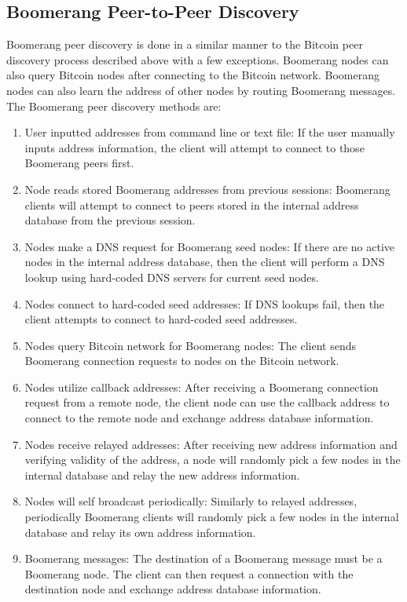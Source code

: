 \subsection{Boomerang Peer-to-Peer Discovery}
Boomerang peer discovery is done in a similar manner to the Bitcoin peer discovery process described above with a few exceptions. Boomerang nodes can also query Bitcoin nodes after connecting to the Bitcoin network. Boomerang nodes can also learn the address of other nodes by routing Boomerang messages. The Boomerang peer discovery methods are:

\begin{enumerate}
	\item User inputted addresses from command line or text file: If the user manually inputs address information, the client will attempt to connect to those Boomerang peers first.
	\item Node reads stored Boomerang addresses from previous sessions: Boomerang clients will attempt to connect to peers stored in the internal address database from the previous session.
	\item Nodes make a DNS request for Boomerang seed nodes: If there are no active nodes in the internal address database, then the client will perform a DNS lookup using hard-coded DNS servers for current seed nodes.
	\item Nodes connect to hard-coded seed addresses: If DNS lookups fail, then the client attempts to connect to hard-coded seed addresses.
	\item Nodes query Bitcoin network for Boomerang nodes: The client sends Boomerang connection requests to nodes on the Bitcoin network.
	\item Nodes utilize callback addresses: After receiving a Boomerang connection request from a remote node, the client node can use the callback address to connect to the remote node and exchange address database information.
	\item Nodes receive relayed addresses: After receiving new address information and verifying validity of the address, a node will randomly pick a few nodes in the internal database and relay the new address information.
	\item Nodes will self broadcast periodically: Similarly to relayed addresses, periodically Boomerang clients will randomly pick a few nodes in the internal database and relay its own address information.
	\item Boomerang messages: The destination of a Boomerang message must be a Boomerang node. The client can then request a connection with the destination node and exchange address database information.
\end{enumerate}

